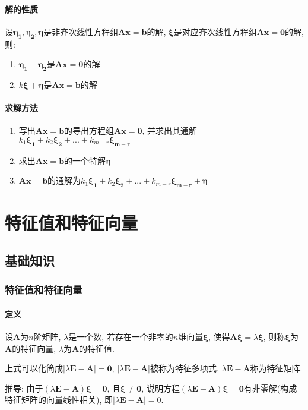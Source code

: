 \subsubsection{解的性质}
设$ \bm{\eta_{1}},\bm{\eta_{2}},\bm{\eta} $是非齐次线性方程组$ \bm{A}\bm{x}=\bm{b} $的解, $ \bm{\xi} $是对应齐次线性方程组$ \bm{A}\bm{x}=\bm{0} $的解, 则:
\begin{enumerate}
\item $ \bm{\eta_{1}}-\bm{\eta_{2}} $是$ \bm{A}\bm{x}=\bm{0} $的解
\item $ k\bm{\xi}+\bm{\eta} $是$ \bm{A}\bm{x}=\bm{b} $的解
\end{enumerate}
\subsubsection{求解方法}
\begin{enumerate}
\item 写出$ \bm{A}\bm{x}=\bm{b} $的导出方程组$ \bm{A}\bm{x}=\bm{0} $, 并求出其通解$ k_{1}\bm{\xi_{1}}+k_{2}\bm{\xi_{2}}+...+k_{m-r}\bm{\xi_{m-r}} $
\item 求出$ \bm{A}\bm{x}=\bm{b} $的一个特解$ \bm{\eta} $
\item $ \bm{A}\bm{x}=\bm{b} $的通解为$ k_{1}\bm{\xi_{1}}+k_{2}\bm{\xi_{2}}+...+k_{m-r}\bm{\xi_{m-r}}+\bm{\eta} $
\end{enumerate}
\chapter{特征值和特征向量}
\section{基础知识}
\subsection{特征值和特征向量}
\subsubsection{定义}
设$ \bm{A} $为$ n $阶矩阵, $ \lambda $是一个数, 若存在一个非零的$ n $维向量$ \bm{\xi} $, 使得$ \bm{A}\bm{\xi}=\lambda \bm{\xi} $, 则称$ \bm{\xi} $为$ \bm{A} $的特征向量, $ \lambda $为$ \bm{A} $的特征值. 
\par 上式可以化简成$ \left| \lambda \bm{E}-\bm{A}\right|=\bm{0} $, $ \left| \lambda \bm{E}-\bm{A}\right| $被称为特征多项式, $ \lambda \bm{E}-\bm{A} $称为特征矩阵. \par
推导: 由于$ (\lambda \bm{E} - \bm{A}) \bm{\xi} = \bm{0} $, 且$ \bm{\xi} \neq \bm{0} $, 说明方程$ (\lambda \bm{E} - \bm{A}) \bm{\xi} = \bm{0} $有非零解(构成特征矩阵的向量线性相关), 即$ |\lambda \bm{E} - \bm{A}| = 0 $.
